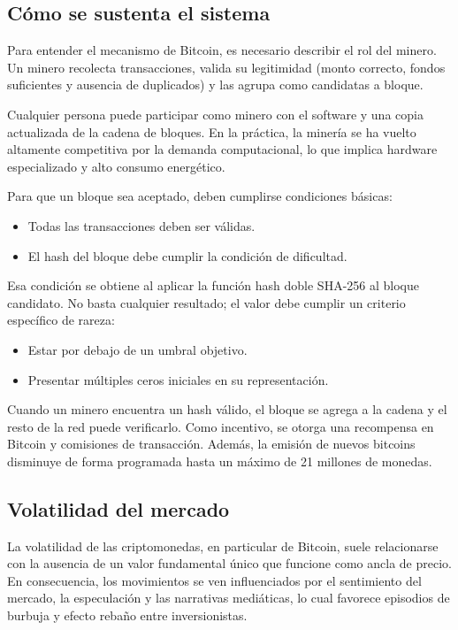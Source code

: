 \documentclass[12pt]{article}
\begin{document}
\subsection{Cómo se sustenta el sistema}

Para entender el mecanismo de Bitcoin, es necesario describir el rol
del minero. Un minero recolecta transacciones, valida su legitimidad
(monto correcto, fondos suficientes y ausencia de duplicados) y las
agrupa como candidatas a bloque.

Cualquier persona puede participar como minero con el software y una
copia actualizada de la cadena de bloques. En la práctica, la minería
se ha vuelto altamente competitiva por la demanda computacional, lo
que implica hardware especializado y alto consumo energético.

Para que un bloque sea aceptado, deben cumplirse condiciones básicas:

\begin{itemize}
  \item Todas las transacciones deben ser válidas.
  \item El hash del bloque debe cumplir la condición de dificultad.
\end{itemize}

Esa condición se obtiene al aplicar la función hash doble SHA-256 al
bloque candidato. No basta cualquier resultado; el valor debe cumplir
un criterio específico de rareza:

\begin{itemize}
  \item Estar por debajo de un umbral objetivo.
  \item Presentar múltiples ceros iniciales en su representación.
\end{itemize}

Cuando un minero encuentra un hash válido, el bloque se agrega a la
cadena y el resto de la red puede verificarlo. Como incentivo, se
otorga una recompensa en Bitcoin y comisiones de transacción. Además,
la emisión de nuevos bitcoins disminuye de forma programada hasta un
máximo de 21 millones de monedas.

\subsection{Volatilidad del mercado}

La volatilidad de las criptomonedas, en particular de Bitcoin, suele
relacionarse con la ausencia de un valor fundamental único que funcione
como ancla de precio. En consecuencia, los movimientos se ven
influenciados por el sentimiento del mercado, la especulación y las
narrativas mediáticas, lo cual favorece episodios de burbuja y efecto
rebaño entre inversionistas.
\end{document}
